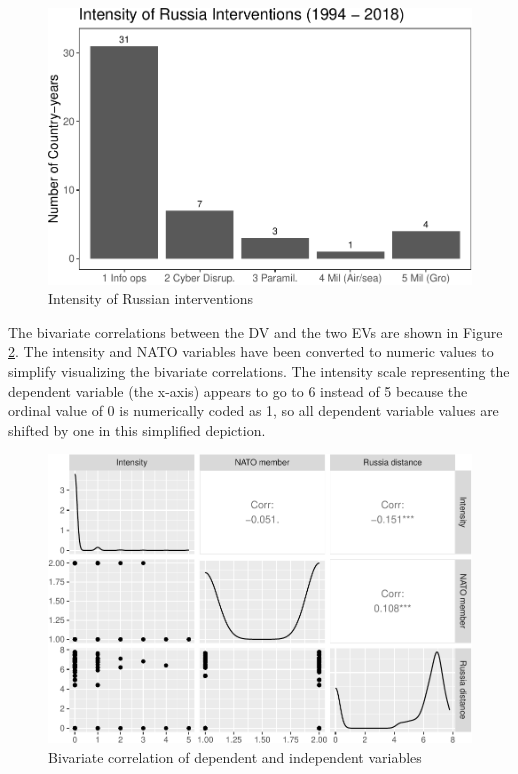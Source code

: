 \documentclass[
]{article}
\begin{document}
\begin{figure}[h!]

{\centering \includegraphics[width=0.9\linewidth,]{07_Appendix_files/figure-latex/dv-1} 

}

\caption{Intensity of Russian interventions}\label{fig:dv}
\end{figure}

The bivariate correlations between the DV and the two EVs are shown in Figure \ref{fig:correlation}. The intensity and NATO variables have been converted to numeric values to simplify visualizing the bivariate correlations. The intensity scale representing the dependent variable (the x-axis) appears to go to 6 instead of 5 because the ordinal value of 0 is numerically coded as 1, so all dependent variable values are shifted by one in this simplified depiction.

\begin{figure}[h!]

{\centering \includegraphics[width=0.9\linewidth,]{07_Appendix_files/figure-latex/correlation-1} 

}

\caption{Bivariate correlation of dependent and independent variables}\label{fig:correlation}
\end{figure}
\end{document}
